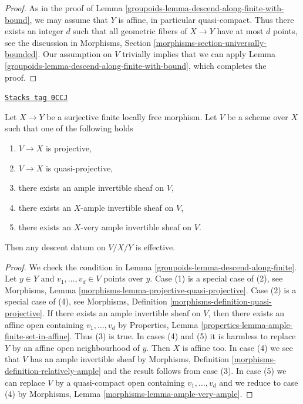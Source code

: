 \begin{proof}

As in the proof of Lemma \ref{groupoids-lemma-descend-along-finite-with-bound}, we
may assume that $Y$ is affine, in particular quasi-compact. Thus there
exists an integer $d$ such that all geometric fibers of $X \to Y$
have at most $d$ points, see the discussion in Morphisms, Section
\ref{morphisms-section-universally-bounded}.
Our assumption on $V$ trivially implies that we can apply
Lemma \ref{groupoids-lemma-descend-along-finite-with-bound}, which completes the proof.
\end{proof}

\begin{lemma}
\label{groupoids-lemma-descend-along-finite-quasi-projective}
\href{https://stacks.math.columbia.edu/tag/0CCJ}{\texttt{Stacks tag 0CCJ}}

Let $X \to Y$ be a surjective finite locally free morphism.
Let $V$ be a scheme over $X$ such that one of the following holds
\begin{enumerate}
\item $V \to X$ is projective,
\item $V \to X$ is quasi-projective,
\item there exists an ample invertible sheaf on $V$,
\item there exists an $X$-ample invertible sheaf on $V$,
\item there exists an $X$-very ample invertible sheaf on $V$.
\end{enumerate}
Then any descent datum on $V/X/Y$ is effective.
\end{lemma}

\begin{proof}

We check the condition in Lemma \ref{groupoids-lemma-descend-along-finite}.
Let $y \in Y$ and $v_1, \ldots, v_d \in V$ points over $y$.
Case (1) is a special case of (2), see
Morphisms, Lemma \ref{morphisms-lemma-projective-quasi-projective}.
Case (2) is a special case of (4), see
Morphisms, Definition \ref{morphisms-definition-quasi-projective}.
If there exists an ample invertible sheaf on $V$, then
there exists an affine open containing $v_1, \ldots, v_d$ by
Properties, Lemma \ref{properties-lemma-ample-finite-set-in-affine}.
Thus (3) is true.
In cases (4) and (5) it is harmless to replace $Y$ by an
affine open neighbourhood of $y$.
Then $X$ is affine too.
In case (4) we see that $V$ has an ample invertible sheaf
by Morphisms, Definition \ref{morphisms-definition-relatively-ample}
and the result follows from case (3).
In case (5) we can replace $V$ by a quasi-compact open containing
$v_1, \ldots, v_d$ and we reduce to case (4) by
Morphisms, Lemma \ref{morphisms-lemma-ample-very-ample}.
\end{proof}

